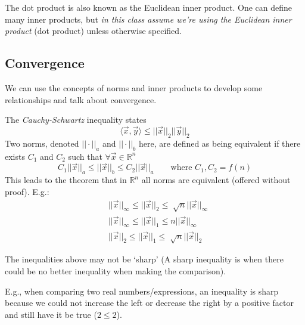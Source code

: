 \documentclass[12pt]{article}
\begin{document}
The dot product is also known as the Euclidean inner product. One can define many inner products, but \textit{in this class assume we're using the Euclidean inner product} (dot product) unless otherwise specified. 

\subsection*{Convergence}
We can use the concepts of norms and inner products to develop some relationships and talk about convergence. 

The \textit{Cauchy-Schwartz} inequality states
%
\begin{equation}
\langle \vec{x}, \vec{y} \rangle \leq ||\vec{x}||_2 ||\vec{y}||_2 \nonumber
\end{equation}
%
Two norms, denoted $|| \cdot ||_a$ and $|| \cdot ||_b$ here, are defined as being equivalent if there exists $C_1$ and $C_2$ such that $\forall \vec{x} \in \mathbb{R}^n$
%
\begin{equation}
C_1 ||\vec{x}||_a \leq ||\vec{x}||_b \leq C_2 ||\vec{x}||_a \qquad \text{where } C_1, C_2 = f(n) \nonumber
\end{equation}
%
This leads to the theorem that in $\mathbb{R}^n$ all norms are equivalent (offered without proof). E.g.:
\begin{align}
& ||\vec{x}||_{\infty} \leq ||\vec{x}||_2 \leq \sqrt[]{n} ||\vec{x}||_{\infty} \nonumber \\
%
& ||\vec{x}||_{\infty} \leq ||\vec{x}||_1 \leq n ||\vec{x}||_{\infty} \nonumber \\
%
& ||\vec{x}||_2 \leq ||\vec{x}||_1 \leq \sqrt[]{n} ||\vec{x}||_2 \nonumber
\end{align}

The inequalities above may not be `sharp' (A sharp inequality is when there could be no better inequality when making the comparison). 

E.g., when comparing two real numbers/expressions, an inequality is sharp because we could not increase the left or decrease the right by a positive factor and still have it be true ($2 \leq 2$). 
\end{document}
